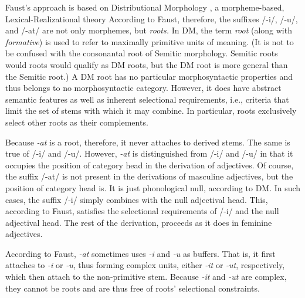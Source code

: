Faust's approach is based on Distributional Morphology 
 \citep{halle-and-marantz:1993}, 
a morpheme-based, Lexical-Realizational theory \citep{stump:2001}
According to Faust, therefore, the suffixes /-i/, /-u/, and /-at/ are not only morphemes, 
but \emph{roots.}
In \ac{DM}, the term \emph{root} (along with \emph{formative}) is used to refer 
to maximally primitive units of meaning. (It is not to be confused with the 
consonantal root of Semitic morphology. Semitic roots
would roots would qualify as \ac{DM} roots, but the \ac{DM} root is more general than the Semitic root.)
A \ac{DM} root has no particular morphosyntactic properties and thus belongs to 
no morphosyntactic category.
However, it does have abstract semantic features as well as inherent 
selectional requirements, i.e., criteria that limit the set of stems with which it 
may combine. In particular, roots exclusively select 
other roots as their complements. %

Because \textit{-at} is a root, therefore, it %
never attaches to derived stems. The same is true of /-i/ and /-u/.  
However, \textit{-at} is distinguished from /-i/ and /-u/ in that it occupies the 
position of category head in the derivation of adjectives.
Of course, the suffix /-at/ is not present in the derivations of masculine adjectives, 
but the position of category head is. 
It is just phonological null, according to \ac{DM}.
In such cases, the suffix /-i/ simply combines with the null adjectival head. 
This, according to Faust, satisfies the selectional requirements of /-i/
and the null adjectival head. The rest of the derivation,
proceeds as it does in feminine adjectives. 

According to Faust, \textit{-at} sometimes uses \textit{-i} and 
\textit{-u} as buffers. That is, it first attaches to \textit{-i} or \textit{-u}, 
thus forming complex units, either \emph{-it} or \emph{-ut}, respectively, 
which then attach to
the non-primitive stem. Because \emph{-it} and \emph{-ut} are complex, 
they cannot be roots and are thus free of roots' selectional constraints.


